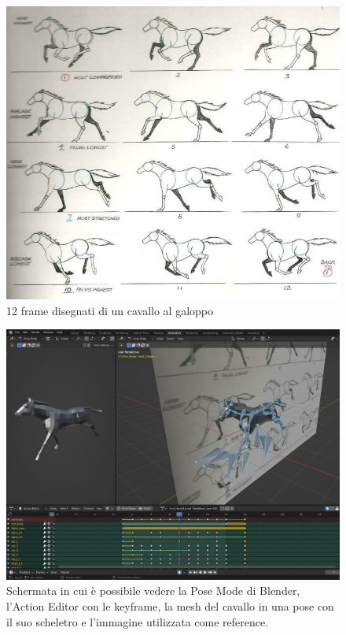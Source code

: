     \begin{figure}[!ht]
        \centering
        \includegraphics[width=.9\textwidth]{figure/HorseAnimation.jpg}
        \caption{12 frame disegnati di un cavallo al galoppo}
    \end{figure}

    \begin{figure}[!ht]
        \centering
        \includegraphics[width=.9\textwidth]{figure/PoseMode2.JPG}
        \caption{Schermata in cui è possibile vedere la Pose Mode di Blender, l'Action Editor con le keyframe, la mesh del cavallo in una pose con il suo scheletro e l'immagine utilizzata come reference.}
    \end{figure}

